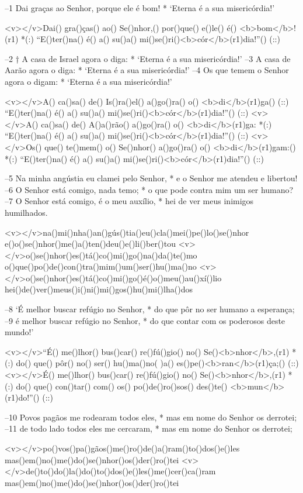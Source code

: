 –1 Dai graças ao Senhor, porque ele é bom! *
‘Eterna é a sua misericórdia!’

<v></v>Dai() gra()ças() ao() Se()nhor,() por()que() e()le() é() <b>bom</b>!(r1) *(:)
``E()ter()na() é() a() su()a() mi()se()ri()<b>cór</b>(r1)dia!''() (::)

–2 † A casa de Israel agora o diga: *
‘Eterna é a sua misericórdia!’
–3 A casa de Aarão agora o diga: *
‘Eterna é a sua misericórdia!’
–4 Os que temem o Senhor agora o digam: *
‘Eterna é a sua misericórdia!’

<v></v>A() ca()sa() de() Is()ra()el() a()go()ra() o() <b>di</b>(r1)ga() (::)
``E()ter()na() é() a() su()a() mi()se()ri()<b>cór</b>(r1)dia!''() (::)
<v></v>A() ca()sa() de() A()a()rão() a()go()ra() o() <b>di</b>(r1)ga: *(:)
``E()ter()na() é() a() su()a() mi()se()ri()<b>cór</b>(r1)dia!''() (::)
<v></v>Os() que() te()mem() o() Se()nhor() a()go()ra() o() <b>di</b>(r1)gam:() *(:)
``E()ter()na() é() a() su()a() mi()se()ri()<b>cór</b>(r1)dia!''() (::)

–5 Na minha angústia eu clamei pelo Senhor, *
e o Senhor me atendeu e libertou!
–6 O Senhor está comigo, nada temo; *
o que pode contra mim um ser humano?
–7 O Senhor está comigo, é o meu auxílio, *
hei de ver meus inimigos humilhados.

<v></v>na()mi()nha()an()gús()tia()eu()cla()mei()pe()lo()se()nhor
e()o()se()nhor()me()a()ten()deu()e()li()ber()tou
<v></v>o()se()nhor()es()tá()co()mi()go()na()da()te()mo
o()que()po()de()con()tra()mim()um()ser()hu()ma()no
<v></v>o()se()nhor()es()tá()co()mi()go()é()o()meu()au()xí()lio
hei()de()ver()meus()i()ni()mi()gos()hu()mi()lha()dos

–8 ‘É melhor buscar refúgio no Senhor, *
do que pôr no ser humano a esperança;
–9 é melhor buscar refúgio no Senhor, *
do que contar com os poderosos deste mundo!’

<v></v>``É() me()lhor() bus()car() re()fú()gio() no() Se()<b>nhor</b>,(r1) *(:)
do() que() pôr() no() ser() hu()ma()no( )a() es()pe()<b>ran</b>(r1)ça;() (::)
<v></v>É() me()lhor() bus()car() re()fú()gio() no() Se()<b>nhor</b>,(r1) *(:)
do() que() con()tar() com() os() po()de()ro()sos() des()te() <b>mun</b>(r1)do!''() (::)

–10 Povos pagãos me rodearam todos eles, *
mas em nome do Senhor os derrotei;
–11 de todo lado todos eles me cercaram, *
mas em nome do Senhor os derrotei;

<v></v>po()vos()pa()gãos()me()ro()de()a()ram()to()dos()e()les
mas()em()no()me()do()se()nhor()os()der()ro()tei
<v></v>de()to()do()la()do()to()dos()e()les()me()cer()ca()ram
mas()em()no()me()do()se()nhor()os()der()ro()tei

